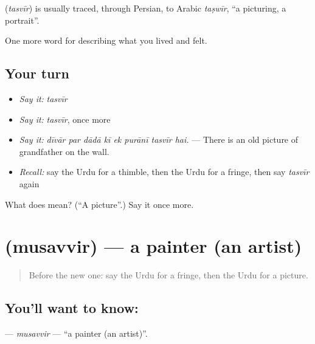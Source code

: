 \begin{cousinweb}
\textbf{} (\emph{tasvīr}) is usually traced, through Persian, to Arabic \emph{taṣwīr}, \textquotedblleft{}a picturing, a portrait\textquotedblright{}.
\end{cousinweb}

\begin{grammarlens}[title={What you've built}]
One more word for describing what you lived and felt.
\end{grammarlens}

\subsection*{Your turn}
\begin{itemize}
\raggedright
  \item \emph{Say it:} \emph{tasvīr}
  \item \emph{Say it:} \emph{tasvīr}, once more
  \item \emph{Say it:} \emph{dīvār par dādā kī ek purānī tasvīr hai.} — There is an old picture of grandfather on the wall.
  \item \emph{Recall:} say the Urdu for a thimble, then the Urdu for a fringe, then say \emph{tasvīr} again
\end{itemize}

\begin{tcolorbox}[breakable,colback=teal!4,colframe=teal!35!black,title={Before you move on}]
What does  mean? (\textquotedblleft{}A picture\textquotedblright{}.) Say it once more.
\end{tcolorbox}
\section[\texorpdfstring{\ur{مصور} (musavvir)}{مصور (musavvir)}]{ (musavvir) — a painter (an artist)}

\label{lesson:UR-C515-musavvir}



\begin{quote}
Before the new one: say the Urdu for a fringe, then the Urdu for a picture.
\end{quote}

\subsection*{You'll want to know: }
\textbf{} — \emph{musavvir} — \textquotedblleft{}a painter (an artist)\textquotedblright{}.

